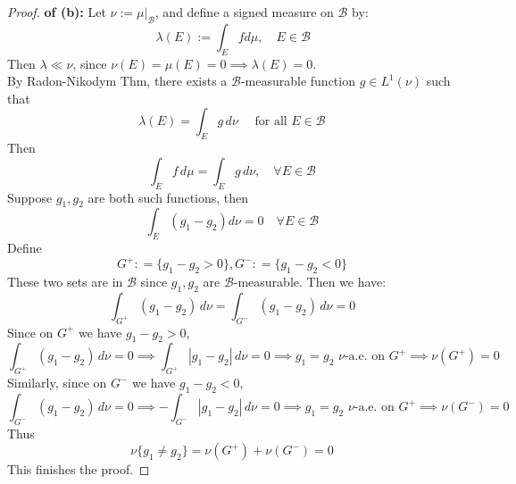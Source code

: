 \documentclass[lang=cn,11pt]{elegantbook}
\begin{document}
\begin{proof}
    \textbf{of (b):}
    Let $\nu:=\left.\mu\right|_{\mathcal{B}}$, and define a signed measure on $\mathcal{B}$ by:
$$
\,\lambda(E):=\int_E f d \mu, \quad  E \in \mathcal{B}
$$
Then $\lambda \ll\nu$, since $\nu(E)=\mu(E)=0 \implies \lambda(E)=0$.\\
By Radon-Nikodym Thm, there exists a $\mathcal{B}$-measurable function $g \in L^1(\nu)$ such that
$$
\lambda(E)=\int_E g\, d \nu \quad \text { for all } E \in \mathcal{B}
$$
Then $$
\int_E f\, d \mu=\int_E g \,d \nu, \quad \forall E \in \mathcal{B}
$$
Suppose $g_1, g_2$ are both such functions, then
$$
\int_E\left(g_1-g_2\right) d \nu=0 \quad \forall E \in \mathcal{B}
$$
Define $$G^+ : = \{ g_1 - g_2 > 0\} , G^- : = \{ g_1 - g_2 < 0\} $$ These two sets are in  $\mathcal{B}$ since $g_1,g_2$ are $\mathcal{B}$-measurable.
Then we have: \[
 \int_{ G^+} (g_1-g_2)\, d \nu =  \int_{ G^-} (g_1-g_2) \, d \nu  = 0
\]
Since on $ G^+$ we have $g_1 - g_2>0$, \[
\int_{ G^+} (g_1-g_2)\, d \nu =  0\implies \int_{ G^+} |g_1-g_2|\, d \nu = 0  \implies g_1 = g_2 \,\, \nu  \text{-a.e. on } G^+ \implies \nu(G^+) = 0
\]
Similarly, since on $ G^-$ we have $g_1 - g_2<0$, \[
\int_{ G^-} (g_1-g_2)\, d \nu =  0\implies -\int_{ G^-} |g_1-g_2|\, d \nu = 0  \implies g_1 = g_2 \,\,\nu\text{-a.e. on } G^+ \implies \nu(G^-) = 0
\]
Thus \[
\nu\{g_1 \not = g_2\} =  \nu(G^+) + \nu(G^-)  = 0
\]
This finishes the proof.
\end{proof}
\end{document}
